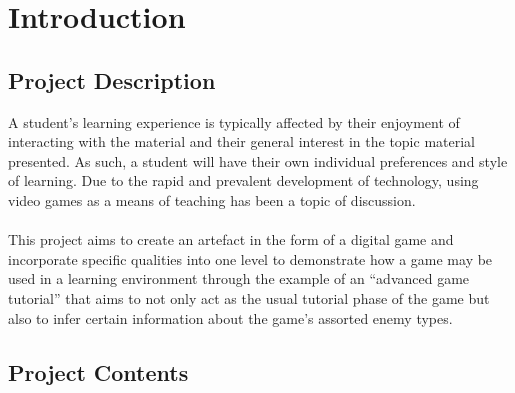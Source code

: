 
\chapter{Introduction} %

\label{Chapter1} %


\newcommand{\keyword}[1]{\textbf{#1}}
\newcommand{\tabhead}[1]{\textbf{#1}}
\newcommand{\code}[1]{\texttt{#1}}
\newcommand{\file}[1]{\texttt{\bfseries#1}}
\newcommand{\option}[1]{\texttt{\itshape#1}}


\section{Project Description}
A student’s learning experience is typically affected by their enjoyment of interacting with the material and their general interest in the topic material presented. As such, a student will have their own individual preferences and style of learning. Due to the rapid and prevalent development of technology, using video games as a means of teaching has been a topic of discussion.
\\\\
This project aims to create an artefact in the form of a digital game and incorporate specific qualities into one level to demonstrate how a game may be used in a learning environment through the example of an “advanced game tutorial” that aims to not only act as the usual tutorial phase of the game but also to infer certain information about the game’s assorted enemy types.

\section{Project Contents}
